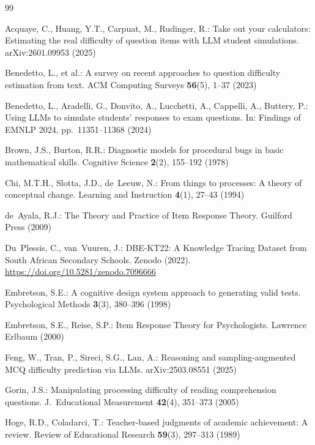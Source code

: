 \documentclass[runningheads]{llncs}
\begin{document}

\begin{thebibliography}{99}

Acquaye, C., Huang, Y.T., Carpuat, M., Rudinger, R.: Take out your calculators: Estimating the real difficulty of question items with LLM student simulations. arXiv:2601.09953 (2025)

Benedetto, L., et al.: A survey on recent approaches to question difficulty estimation from text. ACM Computing Surveys \textbf{56}(5), 1--37 (2023)

Benedetto, L., Aradelli, G., Donvito, A., Lucchetti, A., Cappelli, A., Buttery, P.: Using LLMs to simulate students' responses to exam questions. In: Findings of EMNLP 2024, pp.\ 11351--11368 (2024)

Brown, J.S., Burton, R.R.: Diagnostic models for procedural bugs in basic mathematical skills. Cognitive Science \textbf{2}(2), 155--192 (1978)

Chi, M.T.H., Slotta, J.D., de~Leeuw, N.: From things to processes: A theory of conceptual change. Learning and Instruction \textbf{4}(1), 27--43 (1994)

de~Ayala, R.J.: The Theory and Practice of Item Response Theory. Guilford Press (2009)

Du~Plessis, C., van~Vuuren, J.: DBE-KT22: A Knowledge Tracing Dataset from South African Secondary Schools. Zenodo (2022). \url{https://doi.org/10.5281/zenodo.7096666}

Embretson, S.E.: A cognitive design system approach to generating valid tests. Psychological Methods \textbf{3}(3), 380--396 (1998)

Embretson, S.E., Reise, S.P.: Item Response Theory for Psychologists. Lawrence Erlbaum (2000)

Feng, W., Tran, P., Sireci, S.G., Lan, A.: Reasoning and sampling-augmented MCQ difficulty prediction via LLMs. arXiv:2503.08551 (2025)

Gorin, J.S.: Manipulating processing difficulty of reading comprehension questions. J.\ Educational Measurement \textbf{42}(4), 351--373 (2005)

Hoge, R.D., Coladarci, T.: Teacher-based judgments of academic achievement: A review. Review of Educational Research \textbf{59}(3), 297--313 (1989)


\end{thebibliography}
\end{document}
